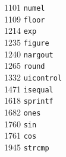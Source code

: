 \begin{footnotesize}
\begin{multicols}{3}
\vspace{-.153cm} 1101  \hspace{.2cm} {\tt numel               }      \\ %
\vspace{-.153cm} 1109  \hspace{.2cm} {\tt floor               }      \\ %
\vspace{-.153cm} 1214  \hspace{.2cm} {\tt exp                 }      \\ %
\vspace{-.153cm} 1235  \hspace{.2cm} {\tt figure              }      \\ %
\vspace{-.153cm} 1240  \hspace{.2cm} {\tt nargout             }      \\ %
\vspace{-.153cm} 1265  \hspace{.2cm} {\tt round               }      \\ %
\vspace{-.153cm} 1332  \hspace{.2cm} {\tt uicontrol           }      \\ %
\vspace{-.153cm} 1471  \hspace{.2cm} {\tt isequal             }      \\ %
\vspace{-.153cm} 1618  \hspace{.2cm} {\tt sprintf             }      \\ %
\vspace{-.153cm} 1682  \hspace{.2cm} {\tt ones                }      \\ %
\vspace{-.153cm} 1760  \hspace{.2cm} {\tt sin                 }      \\ %
\vspace{-.153cm} 1761  \hspace{.2cm} {\tt cos                 }      \\ %
\vspace{-.153cm} 1945  \hspace{.2cm} {\tt strcmp              }      \\ %

\end{multicols}
\end{footnotesize}
